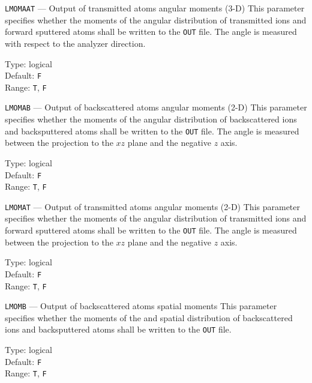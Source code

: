 \begin{keydescription}{\texttt{LMOMAAT} --- Output of transmitted atoms angular
moments (3-D)}
%
  This parameter specifies whether the moments of the angular distribution 
  of transmitted ions and forward sputtered atoms shall be written to
  the \texttt{OUT} file. The angle is measured with respect to the analyzer direction.
  \begin{keytab}
    Type:    \> logical \\
    Default: \> \texttt{F} \\
    Range:   \> \texttt{T}, \texttt{F} 
  \end{keytab}
\end{keydescription}

\begin{keydescription}{\texttt{LMOMAB} --- Output of backscattered atoms
angular moments (2-D)}
%
  This parameter specifies whether the moments of the angular distribution 
  of backscattered ions and backsputtered atoms shall be written to the
  \texttt{OUT} file. The angle is measured
  between the projection to the $xz$ plane and the negative $z$ axis.
  \begin{keytab}
    Type:    \> logical \\
    Default: \> \texttt{F} \\
    Range:   \> \texttt{T}, \texttt{F} 
  \end{keytab}
\end{keydescription}

\begin{keydescription}{\texttt{LMOMAT} --- Output of transmitted atoms angular
moments (2-D)}
%
  This parameter specifies whether the moments of the angular distribution 
  of transmitted ions and forward sputtered atoms shall be written to
  the \texttt{OUT} file. The angle is measured
  between the projection to the $xz$ plane and the negative $z$ axis.
  \begin{keytab}
    Type:    \> logical \\
    Default: \> \texttt{F} \\
    Range:   \> \texttt{T}, \texttt{F} 
  \end{keytab}
\end{keydescription}

\begin{keydescription}{\texttt{LMOMB} --- Output of backscattered atoms
spatial moments}
%
  This parameter specifies whether the moments of the and spatial distribution 
  of backscattered ions and backsputtered atoms shall be written to the \texttt{OUT} file.
  \begin{keytab}
    Type:    \> logical \\
    Default: \> \texttt{F} \\
    Range:   \> \texttt{T}, \texttt{F} 
  \end{keytab}
\end{keydescription}

